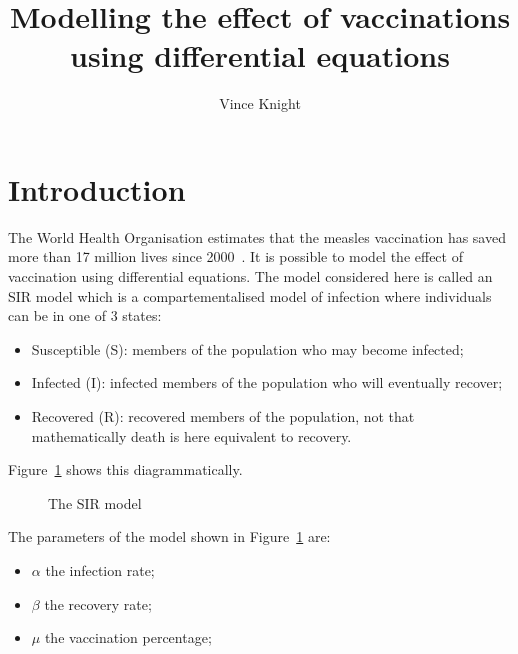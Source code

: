 \documentclass[a4paper]{article}
\title{Modelling the effect of vaccinations using differential equations}
\author{Vince Knight}
\date{}
\begin{document}
\maketitle


\section{Introduction}\label{sec:introduction}


The World Health Organisation estimates that the measles vaccination has saved
more than 17 million lives since 2000~\cite{who}.  It is possible to model the
effect of vaccination using differential equations. The model considered here is
called an SIR model which is a compartementalised model of infection where
individuals can be in one of 3 states:

\begin{itemize}
    \item Susceptible (S): members of the population who may become infected;
    \item Infected (I): infected members of the population who will eventually
        recover;
    \item Recovered (R): recovered members of the population, not that
        mathematically death is here equivalent to recovery.
\end{itemize}

Figure~\ref{fig:sir_model} shows this diagrammatically.

\begin{figure}[!hbtp]
    \begin{center}
    \end{center}
    \caption{The SIR model}
    \label{fig:sir_model}
\end{figure}

The parameters of the model shown in Figure~\ref{fig:sir_model} are:

\begin{itemize}
    \item \(\alpha\) the infection rate;
    \item \(\beta\) the recovery rate;
    \item \(\mu\) the vaccination percentage;
\end{itemize}
\end{document}
